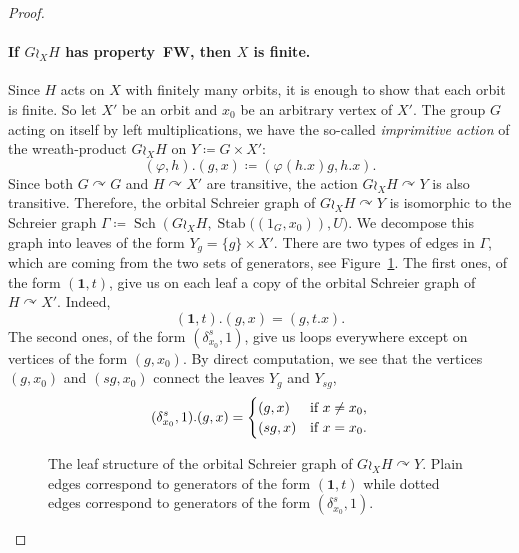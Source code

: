 \documentclass[a4paper]{article}
\theoremstyle{definition}
\theoremstyle{remark}
\DeclareMathOperator\Sch{Sch}
\DeclareMathOperator\stab{Stab}
\begin{document}
\begin{proof}
\paragraph{If $G\wr_XH$ has property~FW, then $X$ is finite.}
Since $H$ acts on $X$ with finitely many orbits, it is enough to show that each orbit is finite.
So let $X'$ be an orbit and $x_0$ be an arbitrary vertex of $X'$.
The group $G$ acting on itself by left multiplications, we have the so-called \emph{imprimitive action} of the wreath-product $G\wr_XH$ on $Y\coloneqq G\times X'$:
\[
	(\varphi,h). (g,x) \coloneqq (\varphi(h.x)g, h.x).
\]
Since both $G\curvearrowright G$ and $H\curvearrowright X'$ are transitive, the action $G\wr_XH\curvearrowright Y$ is also transitive.
Therefore, the orbital Schreier graph of $G\wr_XH\curvearrowright Y$ is isomorphic to the Schreier graph $\Gamma\coloneqq\Sch\left(G\wr_XH, \stab((1_G,x_0)\right), U)$. We decompose this graph into leaves of the form $Y_g = \{ g \} \times X'$. There are two types of edges in $\Gamma$, which are coming from the two sets of generators, see Figure~\ref{Figure:Leaves}. The first ones, of the form $(\mathbf 1,t)$, give us on each leaf a copy of the orbital Schreier graph of $H \curvearrowright X'$. Indeed,
\[
	(\mathbf 1,t).(g,x) = (g, t.x).
\]
The second ones, of the form $(\delta_{x_0}^s,1)$, give us loops everywhere except on vertices of the form $(g,x_0)$. By direct computation, we see that the vertices $(g,x_0)$ and $(sg,x_0)$ connect the leaves $Y_g$ and $Y_{sg}$,
\[
	(\delta_{x_0}^s,1).(g,x) =
		\begin{cases}
		(g,x) & \textnormal{if }x \neq x_0, \\
		(sg, x) & \textnormal{if }x = x_0.
		\end{cases}
\]
%
%
\begin{figure}[htbp]\centering
{}
\caption{The leaf structure of the orbital Schreier graph of $G\wr_XH \curvearrowright Y$. Plain edges correspond to generators of the form $(\mathbf 1,t)$ while dotted edges correspond to generators of the form $(\delta_{x_0}^s,1)$.}
\label{Figure:Leaves}
\end{figure}


\end{proof}
\end{document}
